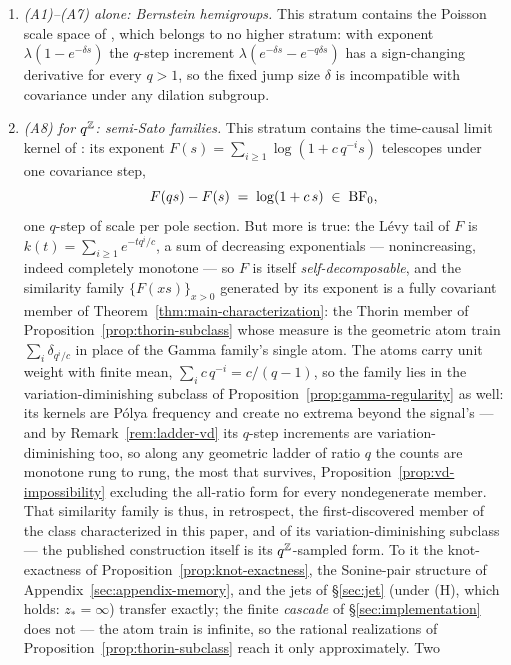 \begin{remark}
\begin{enumerate}
\item \emph{(A1)--(A7) alone: Bernstein hemigroups.} This stratum contains the Poisson scale
space of , which belongs to no higher stratum: with exponent
$\lambda(1 - e^{-\delta s})$ the $q$-step increment $\lambda(e^{-\delta s} - e^{-q\delta s})$
has a sign-changing derivative for every $q > 1$, so the fixed jump size $\delta$ is
incompatible with covariance under any dilation subgroup.
\item \emph{(A8) for $q^{\mathbb{Z}}$: semi-Sato families.} This stratum contains the time-causal
limit kernel of : its exponent
$F(s) = \sum_{i \ge 1} \log(1 + c\,q^{-i}s)$ telescopes under one covariance step,
\[
  F(qs) - F(s) \;=\; \log(1 + c\,s) \;\in\; \mathrm{BF}_0,
\]
one $q$-step of scale per pole section. But more is true: the Lévy tail of $F$ is
$k(t) = \sum_{i \ge 1} e^{-t q^{i}/c}$, a sum of decreasing exponentials --- nonincreasing,
indeed completely monotone --- so $F$ is itself \emph{self-decomposable}, and the similarity
family $\{F(x s)\}_{x > 0}$ generated by its exponent is a fully covariant member of
Theorem~\ref{thm:main-characterization}: the Thorin member of
Proposition~\ref{prop:thorin-subclass} whose measure is the geometric atom train
$\sum_i \delta_{q^i/c}$ in place of the Gamma family's single atom. The atoms carry unit
weight with finite mean, $\sum_i c\,q^{-i} = c/(q-1)$, so the family lies in the
variation-diminishing subclass of Proposition~\ref{prop:gamma-regularity} as well: its
kernels are P\'olya frequency and create no extrema beyond the signal's --- and by
Remark~\ref{rem:ladder-vd} its $q$-step increments are variation-diminishing too, so along
any geometric ladder of ratio $q$ the counts are monotone rung to rung, the most that
survives, Proposition~\ref{prop:vd-impossibility} excluding the all-ratio form for every
nondegenerate member. That similarity family
is thus, in retrospect, the first-discovered member of the class characterized in this
paper, and of its variation-diminishing subclass --- the published construction itself is
its $q^{\mathbb{Z}}$-sampled form. To it the
knot-exactness of Proposition~\ref{prop:knot-exactness}, the Sonine-pair structure of
Appendix~\ref{sec:appendix-memory}, and the jets of \S\ref{sec:jet} (under (H), which
holds: $z_* = \infty$) transfer exactly; the finite \emph{cascade} of
\S\ref{sec:implementation} does not --- the atom train is infinite, so the rational
realizations of Proposition~\ref{prop:thorin-subclass} reach it only approximately. Two

\end{enumerate}
\end{remark}
